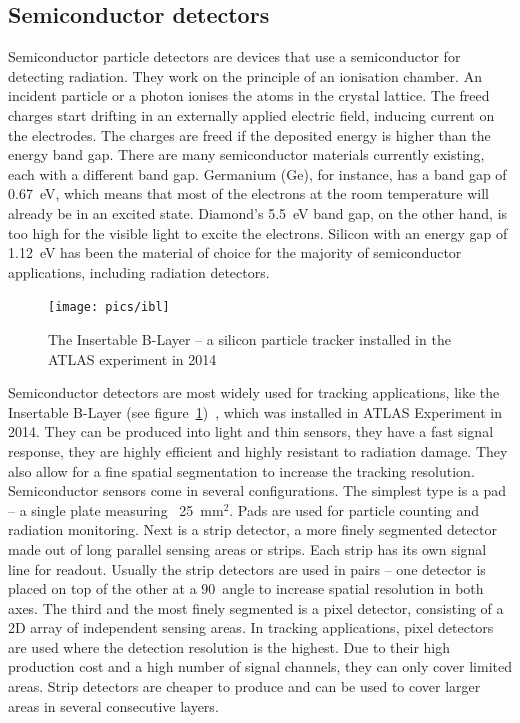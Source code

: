 \documentclass[twoside,12pt]{packages/mytustyle}  %
\begin{document}


\subsection{Semiconductor detectors}
Semiconductor particle detectors are devices that use a semiconductor for detecting radiation. They work on the principle of an ionisation chamber. An incident particle or a photon ionises the atoms in the crystal lattice. The freed charges start drifting in an externally applied electric field, inducing current on the electrodes. The charges are freed if the deposited energy is higher than the energy band gap. There are many semiconductor materials currently existing, each with a different band gap. Germanium (Ge), for instance, has a band gap of 0.67~eV, which means that most of the electrons at the room temperature will already be in an excited state. Diamond's 5.5~eV band gap, on the other hand, is too high for the visible light to excite the electrons. Silicon with an energy gap of 1.12~eV has been the material of choice for the majority of semiconductor applications, including radiation detectors. 
\begin{figure}[!t]
\centering
\texttt{[image: pics/ibl]}
\caption{The Insertable B-Layer -- a silicon particle tracker installed in the ATLAS experiment in 2014 \cite{MarcelloniDeOliveira:1702006}}
\label{fig:ibl}
\end{figure}
Semiconductor detectors are most widely used for tracking applications, like the Insertable B-Layer (see figure~\ref{fig:ibl})~\cite{Pernegger:1985432}, which was installed in ATLAS Experiment in 2014. They can be produced into light and thin sensors, they have a fast signal response, they are highly efficient and highly resistant to radiation damage. They also allow for a fine spatial segmentation to increase the tracking resolution. Semiconductor sensors come in several configurations. The simplest type is a pad -- a single plate measuring ~25~mm$^2$. Pads are used for particle counting and radiation monitoring. Next is a strip detector, a more finely segmented detector made out of long parallel sensing areas or strips. Each strip has its own signal line for readout. Usually the strip detectors are used in pairs -- one detector is placed on top of the other at a 90\textdegree~angle to increase spatial resolution in both axes. The third and the most finely segmented is a pixel detector, consisting of a 2D array of independent sensing areas. In tracking applications, pixel detectors are used where the detection resolution is the highest. Due to their high production cost and a high number of signal channels, they can only cover limited areas. Strip detectors are cheaper to produce and can be used to cover larger areas in several consecutive layers.
\end{document}
